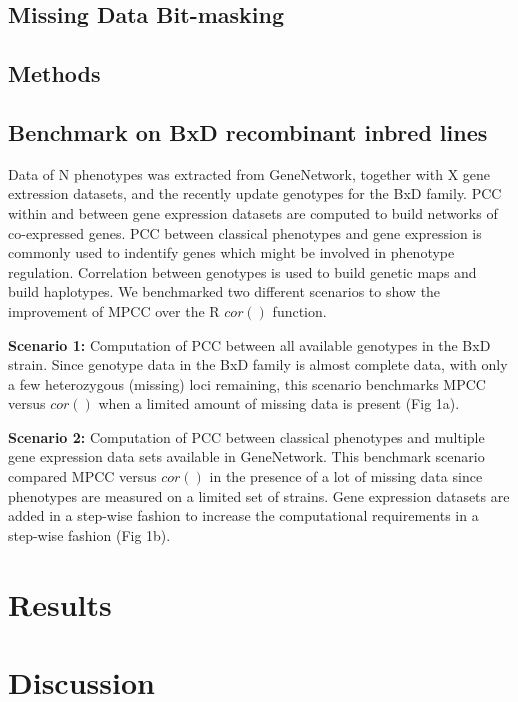 \documentclass{bioinfo}
\begin{document}
\subsection{Missing Data Bit-masking}

\begin{methods}
\section{Methods}

\subsection{Benchmark on BxD recombinant inbred lines}
Data of N phenotypes was extracted from GeneNetwork, together with 
X gene extression datasets, and the recently update genotypes for 
the BxD family. PCC within and between gene expression datasets are 
computed to build networks of co-expressed genes. PCC between 
classical phenotypes and gene expression is commonly used to 
indentify genes which might be involved in phenotype regulation. 
Correlation between genotypes is used to build genetic maps and 
build haplotypes. We benchmarked two different scenarios to show 
the improvement of MPCC over the R $cor()$ function.

{\bf Scenario 1:} Computation of PCC between all available genotypes 
in the BxD strain. Since genotype data in the BxD family is almost 
complete data, with only a few heterozygous (missing) loci remaining, 
this scenario benchmarks MPCC versus $cor()$ when a limited amount of 
missing data is present (Fig 1a).

{\bf Scenario 2:} Computation of PCC between classical phenotypes and 
multiple gene expression data sets available in GeneNetwork. This 
benchmark scenario compared MPCC versus $cor()$ in the presence of 
a lot of missing data since phenotypes are measured on a limited set 
of strains. Gene expression datasets are added in a step-wise fashion 
to increase the computational requirements in a step-wise fashion 
(Fig 1b).

\end{methods}

\section{Results}

\section{Discussion}
\end{document}
